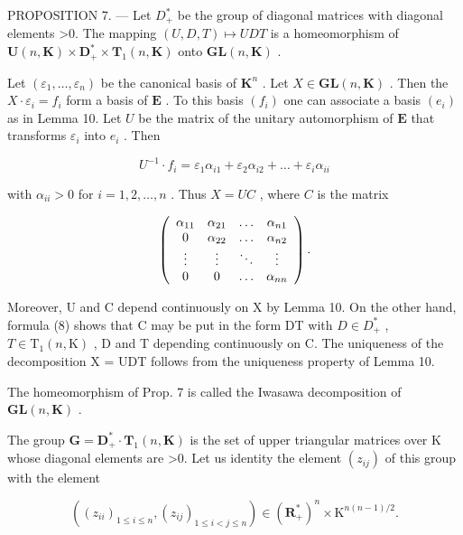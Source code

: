 PROPOSITION 7. --- Let \(D_{+}^{*}\) be the group of diagonal matrices with diagonal elements \textgreater0. The mapping \((U,D,T)\mapsto UDT\) is a homeomorphism of \(\mathbf{U}(n,\mathbf{K})\times\mathbf{D}_{+}^{*}\times\mathbf{T}_{1}(n,\mathbf{K})\) onto \(\mathbf{GL}(n,\mathbf{K})\) .

Let \((\varepsilon_1, \ldots, \varepsilon_n)\) be the canonical basis of \(\mathbf{K}^n\) . Let \(X \in \mathbf{GL}(n, \mathbf{K})\) . Then the \(X \cdot \varepsilon_i = f_i\) form a basis of \(\mathbf{E}\) . To this basis \((f_i)\) one can associate a basis \((e_i)\) as in Lemma 10. Let \(U\) be the matrix of the unitary automorphism of \(\mathbf{E}\) that transforms \(\varepsilon_i\) into \(e_i\) . Then

\[
U ^ {- 1} \cdot f _ {i} = \varepsilon_ {1} \alpha_ {i 1} + \varepsilon_ {2} \alpha_ {i 2} + \dots + \varepsilon_ {i} \alpha_ {i i}
\]

with \(\alpha_{ii} > 0\) for \(i = 1,2,\ldots ,n\) . Thus \(X = UC\) , where \(C\) is the matrix

\[
\left( \begin{array}{c c c c} \alpha_ {1 1} & \alpha_ {2 1} & \ldots & \alpha_ {n 1} \\ 0 & \alpha_ {2 2} & \ldots & \alpha_ {n 2} \\ \vdots & \vdots & \ddots & \vdots \\ 0 & 0 & \ldots & \alpha_ {n n} \end{array} \right).
\]

Moreover, U and C depend continuously on X by Lemma 10. On the other hand, formula (8) shows that C may be put in the form DT with \(D \in D_{+}^{*}\) , \(T \in \mathrm{T}_{1}(n, \mathrm{K})\) , D and T depending continuously on C. The uniqueness of the decomposition X = UDT follows from the uniqueness property of Lemma 10.

The homeomorphism of Prop. 7 is called the Iwasawa decomposition of \(\mathbf{GL}(n,\mathbf{K})\) .

The group \(\mathbf{G} = \mathbf{D}_{+}^{*} \cdot \mathbf{T}_{1}(n, \mathbf{K})\) is the set of upper triangular matrices over K whose diagonal elements are \textgreater0. Let us identity the element \((z_{ij})\) of this group with the element

\[
\left(\left(z _ {i i}\right) _ {1 \leqslant i \leqslant n}, \left(z _ {i j}\right) _ {1 \leqslant i <   j \leqslant n}\right) \in \left(\mathbf {R} _ {+} ^ {*}\right) ^ {n} \times \mathrm{K} ^ {n (n - 1) / 2}.
\]

